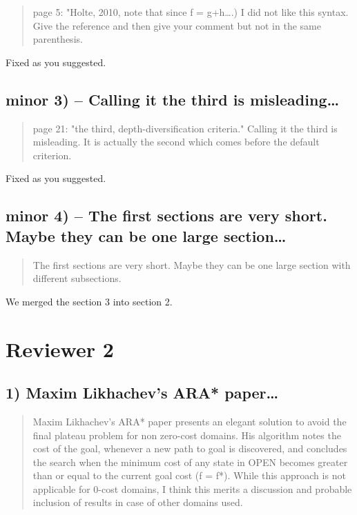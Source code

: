 \documentclass{article}
\begin{document}
\begin{quote}
page 5: "Holte, 2010, note that since f = g+h\ldots{}.) I did not like this
syntax. Give the reference and then give your comment but not in the
same parenthesis.
\end{quote}


Fixed as you suggested.

\subsection{minor 3) -- Calling it the  third is misleading\ldots{}}
\label{sec:orgheadline11}

\begin{quote}
page 21: "the third, depth-diversification criteria." Calling it the
third is misleading. It is actually the second which comes before the
default criterion.
\end{quote}

Fixed as you suggested.

\subsection{minor 4) -- The first sections are very short. Maybe they can be one large section\ldots{}}
\label{sec:orgheadline12}

\begin{quote}
The first sections are very short. Maybe they can be one large section
with different subsections.
\end{quote}

We merged the section 3 into section 2.

\section{Reviewer 2}
\label{sec:orgheadline24}

\subsection{1) Maxim Likhachev's ARA* paper\ldots{}}
\label{sec:orgheadline14}

\begin{quote}
 Maxim Likhachev's ARA* paper presents an elegant solution to
avoid the final plateau problem for non zero-cost domains. His
algorithm notes the cost of the goal, whenever a new path to goal is
discovered, and concludes the search when the minimum cost of any
state in OPEN becomes greater than or equal to the current goal cost
(f = f*). While this approach is not applicable for 0-cost domains, I
think this merits a discussion and probable inclusion of results in
case of other domains used.
\end{quote}
\end{document}

